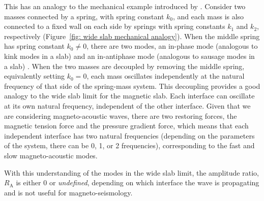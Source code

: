 \documentclass[namedreferences]{solarphysics}
\numberwithin{equation}{section}
\begin{document}
\begin{article}
This has an analogy to the mechanical example introduced by \citealp{all_etal17}. Consider two masses connected by a spring, with spring constant $k_0$, and each mass is also connected to a fixed wall on each side by springs with spring constants $k_1$ and $k_2$, respectively (Figure~\ref{fig: wide slab mechanical analogy}). When the middle spring has spring constant $k_0 \neq 0$, there are two modes, an in-phase mode (analogous to kink modes in a slab) and an in-antiphase mode (analogous to sausage modes in a slab) \citep{all_etal17}. When the two masses are decoupled by removing the middle spring, equivalently setting $k_0 = 0$, each mass oscillates independently at the natural frequency of that side of the spring-mass system. This decoupling provides a good analogy to the wide slab limit for the magnetic slab. Each interface can oscillate at its own natural frequency, independent of the other interface. Given that we are considering magneto-acoustic waves, there are two restoring forces, the magnetic tension force and the pressure gradient force, which means that each independent interface has two natural frequencies (depending on the parameters of the system, there can be 0, 1, or 2 frequencies), corresponding to the fast and slow magneto-acoustic modes.

With this understanding of the modes in the wide slab limit, the amplitude ratio, $R_\textrm{A}$ is either $0$ or \textit{undefined}, depending on which interface the wave is propagating and is not useful for magneto-seismology.

\begin{figure}
\end{figure}
\end{article}
\end{document}
